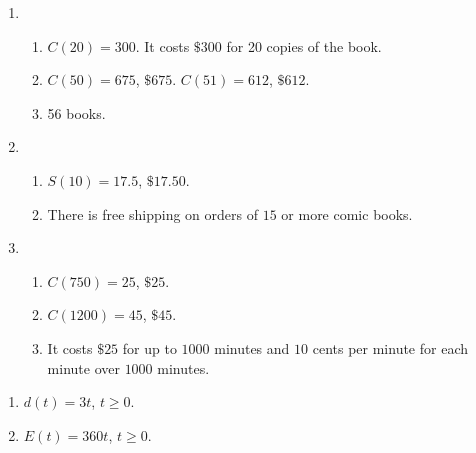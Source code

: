 \documentclass{ximera}
\begin{document}
\begin{enumerate}

\setcounter{enumi}{\value{HW}}


\item


\begin{enumerate}

\item   $C(20) = 300$.  It costs $\$300$ for 20 copies of the book.

\item $C(50) = 675$, $\$ 675$.  $C(51) = 612$, $\$ 612$.

\item   56 books.

\end{enumerate}

\item

\begin{enumerate}

\item   $S(10) = 17.5$, $\$ 17.50$.

\item  There is free shipping on orders of $15$ or more comic books.

\end{enumerate}

\item

\begin{enumerate}

\item   $C(750) = 25$, $\$ 25$.

\item   $C(1200) = 45$, $\$ 45$.

\item  It costs $\$25$ for up to $1000$ minutes and $10$ cents per minute for each minute over $1000$ minutes.

\end{enumerate}

\setcounter{HW}{\value{enumi}}
\end{enumerate}


\begin{multicols}{2}
\begin{enumerate}
\setcounter{enumi}{\value{HW}}

\item  $d(t) = 3t$, $t \geq 0$.
\item  $E(t) = 360t$, $t \geq 0$.

\setcounter{HW}{\value{enumi}}
\end{enumerate}
\end{multicols}
\end{document}
